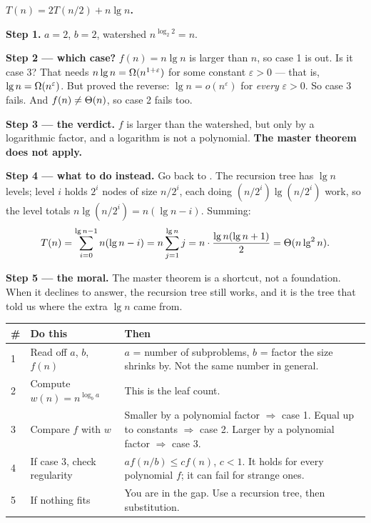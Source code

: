 \begin{worked}
\textbf{$T(n) = 2T(n/2) + n \lg n$.}

\smallskip
\textbf{Step 1.} $a = 2$, $b = 2$, watershed $n^{\log_{2}2} = n$.

\smallskip
\textbf{Step 2 --- which case?} $f(n) = n\lg n$ is larger than $n$, so case 1
is out. Is it case 3? That needs $n\operatorname{lg} n = \Omega(n^{1+\varepsilon})$ for some
constant $\varepsilon > 0$ --- that is, $\operatorname{lg} n = \Omega(n^{\varepsilon})$. But
 proved the reverse: $\lg n = o(n^{\varepsilon})$ for
\emph{every} $\varepsilon > 0$. So case 3 fails. And $f(n) \ne \Theta(n)$, so
case 2 fails too.

\smallskip
\textbf{Step 3 --- the verdict.} $f$ is larger than the watershed, but only by
a logarithmic factor, and a logarithm is not a polynomial. \textbf{The master
theorem does not apply.}

\smallskip
\textbf{Step 4 --- what to do instead.} Go back to . The
recursion tree has $\lg n$ levels; level $i$ holds $2^{i}$ nodes of size
$n/2^{i}$, each doing $(n/2^{i})\lg(n/2^{i})$ work, so the level totals
$n \lg(n/2^{i}) = n(\lg n - i)$. Summing:
\[ T(n) = \sum_{i=0}^{\operatorname{lg} n - 1} n(\operatorname{lg} n - i)
        = n \sum_{j=1}^{\operatorname{lg} n} j
        = n \cdot \frac{\operatorname{lg} n (\operatorname{lg} n + 1)}{2}
        = \Theta(n \operatorname{lg}^{2} n). \]

\smallskip
\textbf{Step 5 --- the moral.} The master theorem is a shortcut, not a
foundation. When it declines to answer, the recursion tree still works, and it
is the tree that told us where the extra $\lg n$ came from.
\end{worked}

\begin{conceptbox}
\begin{longtable}{@{}L{1.0cm}L{6.2cm}L{7.0cm}@{}}
\toprule
{}
\textbf{\#} & \textbf{Do this} & \textbf{Then} \\
\midrule
{} & Read off $a$, $b$, $f(n)$ & $a$ = number of subproblems, $b$ = factor the
  size shrinks by. Not the same number in general. \\
2 & Compute $w(n) = n^{\log_{b} a}$ & This is the leaf count. \\
3 & Compare $f$ with $w$ & Smaller by a polynomial factor $\Rightarrow$ case 1.
  Equal up to constants $\Rightarrow$ case 2. Larger by a polynomial factor
  $\Rightarrow$ case 3. \\
4 & If case 3, check regularity & $a f(n/b) \le c f(n)$, $c<1$. It holds for
  every polynomial $f$; it can fail for strange ones. \\
5 & If nothing fits & You are in the gap. Use a recursion tree, then
  substitution. \\
\bottomrule
\end{longtable}
\end{conceptbox}

